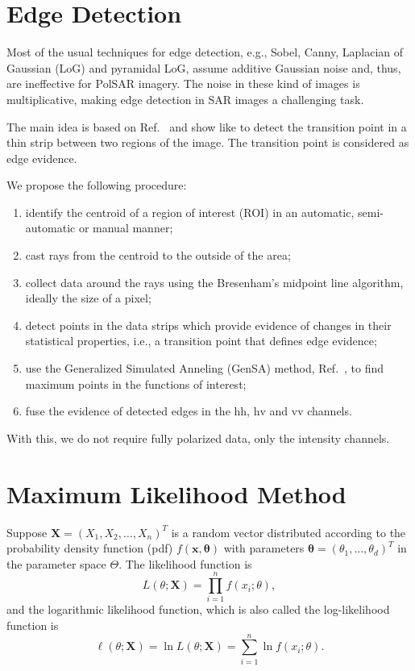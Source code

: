 \documentclass[conference]{IEEEtran}
\begin{document}
\section{Edge Detection}\label{sec_04}

Most of the usual techniques for edge detection, e.g., 
Sobel, Canny, Laplacian of Gaussian (LoG) and pyramidal LoG, assume additive Gaussian noise and, thus, are ineffective for PolSAR imagery.
The noise in these kind of images is multiplicative, making edge detection in SAR images a challenging task.

The main idea is based on Ref.~\cite{nhfc, gmbf} and show like to detect the transition point in a thin strip between two regions of the image. The transition point is considered as edge evidence. 

We propose the following procedure:
\begin{enumerate}
	\item identify the centroid of a region of interest (ROI) in an automatic, semi-automatic or manual manner;
	\item cast rays from the centroid to the outside of the area;
	\item collect data around the rays using the  Bresenham's midpoint line algorithm, ideally the size of a pixel;
	\item detect points in the data strips which provide evidence of changes in their statistical properties, i.e., a transition point that defines edge evidence;
	\item use the Generalized Simulated Anneling (GenSA) method, Ref.~\cite{xgsh}, to find maximum points in the functions of interest;
	\item fuse the evidence of detected edges in the $\text{hh}$, $\text{hv}$ and $\text{vv}$ channels.
\end{enumerate}
With this, we do not require fully polarized data, only the intensity channels.

\section{Maximum Likelihood Method}\label{sec_05}

Suppose $\mathbf{X}=(X_1,X_2,\dots,X_n)^T$ is a random vector distributed according to the probability density function (pdf) $f(\mathbf{x},\mathbf{\theta})$ with parameters $\mathbf{\theta}=(\theta_1,\dots,\theta_d)^T$ in the parameter space $\Theta$.
The likelihood function is
\begin{equation*}
    L(\theta;\mathbf{X}) = \prod_{i=1}^{n}f(x_i;\theta),
\end{equation*}
and the logarithmic likelihood function, which is also called the log-likelihood function is
\begin{equation}
	\ell(\theta;\mathbf{X})= \ln L(\theta;\mathbf{X}) = \sum_{i=1}^{n}\ln f(x_i;\theta).
	\label{eq_05}
\end{equation}
\end{document}
